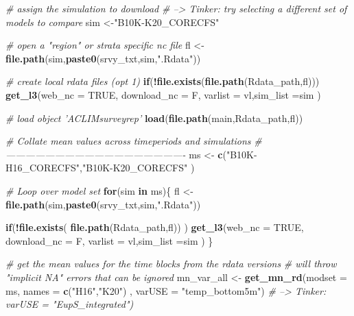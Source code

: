\documentclass[
]{article}
\newenvironment{Shaded}{\begin{snugshade}}{\end{snugshade}}
\newcommand{\CommentTok}[1]{\textcolor[rgb]{0.56,0.35,0.01}{\textit{#1}}}
\newcommand{\ControlFlowTok}[1]{\textcolor[rgb]{0.13,0.29,0.53}{\textbf{#1}}}
\newcommand{\DataTypeTok}[1]{\textcolor[rgb]{0.13,0.29,0.53}{#1}}
\newcommand{\KeywordTok}[1]{\textcolor[rgb]{0.13,0.29,0.53}{\textbf{#1}}}
\newcommand{\NormalTok}[1]{#1}
\newcommand{\OperatorTok}[1]{\textcolor[rgb]{0.81,0.36,0.00}{\textbf{#1}}}
\newcommand{\OtherTok}[1]{\textcolor[rgb]{0.56,0.35,0.01}{#1}}
\newcommand{\StringTok}[1]{\textcolor[rgb]{0.31,0.60,0.02}{#1}}
\begin{document}
\begin{Shaded}
\begin{Highlighting}[]
{    \CommentTok{# assign the simulation to download}
    \CommentTok{# --> Tinker: try selecting a different set of models to compare}
\NormalTok{    sim        <-}\StringTok{"B10K-K20_CORECFS"} 
    
    \CommentTok{# open a "region" or strata specific nc file}
\NormalTok{    fl         <-}\StringTok{ }\KeywordTok{file.path}\NormalTok{(sim,}\KeywordTok{paste0}\NormalTok{(srvy_txt,sim,}\StringTok{".Rdata"}\NormalTok{))}
     
    \CommentTok{# create local rdata files (opt 1)}
    \ControlFlowTok{if}\NormalTok{(}\OperatorTok{!}\KeywordTok{file.exists}\NormalTok{(}\KeywordTok{file.path}\NormalTok{(Rdata_path,fl)))}
      \KeywordTok{get_l3}\NormalTok{(}\DataTypeTok{web_nc =} \OtherTok{TRUE}\NormalTok{, }\DataTypeTok{download_nc =}\NormalTok{ F,}
          \DataTypeTok{varlist =}\NormalTok{ vl,}\DataTypeTok{sim_list =}\NormalTok{sim )}
    
    \CommentTok{# load object 'ACLIMsurveyrep'}
    \KeywordTok{load}\NormalTok{(}\KeywordTok{file.path}\NormalTok{(main,Rdata_path,fl))   }
    
    
    \CommentTok{# Collate mean values across timeperiods and simulations}
    \CommentTok{# -------------------------------------------------------}
\NormalTok{    ms <-}\StringTok{ }\KeywordTok{c}\NormalTok{(}\StringTok{"B10K-H16_CORECFS"}\NormalTok{,}\StringTok{"B10K-K20_CORECFS"}\NormalTok{ )}
   
    \CommentTok{# Loop over model set}
    \ControlFlowTok{for}\NormalTok{(sim }\ControlFlowTok{in}\NormalTok{ ms)\{}
\NormalTok{     fl         <-}\StringTok{ }\KeywordTok{file.path}\NormalTok{(sim,}\KeywordTok{paste0}\NormalTok{(srvy_txt,sim,}\StringTok{".Rdata"}\NormalTok{))}
     
    \ControlFlowTok{if}\NormalTok{(}\OperatorTok{!}\KeywordTok{file.exists}\NormalTok{( }\KeywordTok{file.path}\NormalTok{(Rdata_path,fl)) )}
      \KeywordTok{get_l3}\NormalTok{(}\DataTypeTok{web_nc =} \OtherTok{TRUE}\NormalTok{, }\DataTypeTok{download_nc =}\NormalTok{ F,}
          \DataTypeTok{varlist =}\NormalTok{ vl,}\DataTypeTok{sim_list =}\NormalTok{sim )}
\NormalTok{    \}}
      
    \CommentTok{# get the mean values for the time blocks from the rdata versions}
    \CommentTok{# will throw "implicit NA" errors that can be ignored}
\NormalTok{    mn_var_all <-}\StringTok{ }\KeywordTok{get_mn_rd}\NormalTok{(}\DataTypeTok{modset =}\NormalTok{ ms,}
                            \DataTypeTok{names  =} \KeywordTok{c}\NormalTok{(}\StringTok{"H16"}\NormalTok{,}\StringTok{"K20"}\NormalTok{) ,}
                            \DataTypeTok{varUSE =} \StringTok{"temp_bottom5m"}\NormalTok{)}
    \CommentTok{# --> Tinker:           varUSE = "EupS_integrated") }
    
}
\end{Highlighting}
\end{Shaded}
\end{document}
